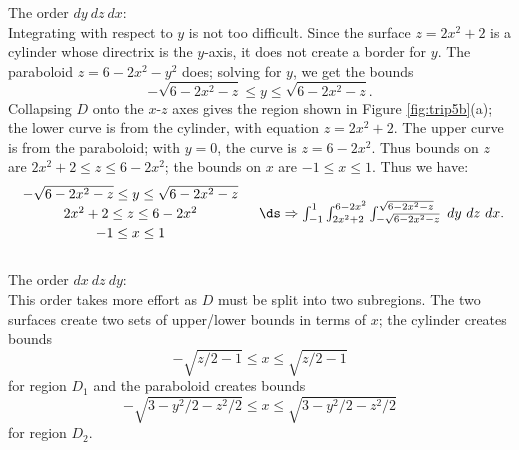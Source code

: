 {\noindent The order $dy\ dz\ dx$:\\

Integrating with respect to $y$ is not too difficult. Since the surface $z=2x^2+2$ is a cylinder whose directrix is the $y$-axis, it does not create a border for $y$. The paraboloid $z=6-2x^2-y^2$ does; solving for $y$, we get the bounds 
$$-\sqrt{6-2x^2-z}\leq y\leq \sqrt{6-2x^2-z}.$$ Collapsing $D$ onto the $x$-$z$ axes gives the region shown in Figure \ref{fig:trip5b}(a); the lower curve is from the cylinder, with equation $z=2x^2+2$. The upper curve is from the paraboloid; with $y=0$, the curve is $z=6-2x^2$. Thus bounds on $z$ are $2x^2+2\leq z\leq 6-2x^2$; the bounds on $x$ are $-1\leq x\leq 1$. Thus we have:
$$\begin{array}{cc}
		\begin{array}{c}
		-\sqrt{6-2x^2-z}\leq y\leq \sqrt{6-2x^2-z}\\[2pt]
		2x^2+2\leq z\leq 6-2x^2\\[2pt]
		-1\leq x\leq 1
		\end{array} 
		& 
		\ds \Rightarrow \int_{-1}^1\int_{2x^2+2}^{6-2x^2}\int_{-\sqrt{6-2x^2-z}}^{\sqrt{6-2x^2-z}}\ dy\ dz\ dx. 
	\end{array}
$$\\



\noindent The order $dx\ dz\ dy$:\\

This order takes more effort as $D$ must be split into two subregions. The two surfaces create two sets of upper/lower bounds in terms of $x$; the cylinder creates bounds $$-\sqrt{z/2-1}\leq x\leq \sqrt{z/2-1}$$ for region $D_1$  and the paraboloid creates bounds $$-\sqrt{3-y^2/2-z^2/2}\leq x\leq \sqrt{3-y^2/2-z^2/2}$$ for region $D_2$.



}
